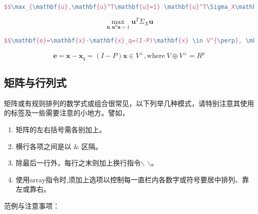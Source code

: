   \begin{lstlisting}[language=TeX,numbers=none,frame=lrtb,label=bast,caption=\song 最佳化问题] 
   $$\max_{\mathbf{u},\mathbf{u}^T\mathbf{u}=1} \mathbf{u}^T\Sigma_X\mathbf{u}$$
  \end{lstlisting} 
  $$\max_{\mathbf{u},\mathbf{u}^T\mathbf{u}=1} \mathbf{u}^T\Sigma_X\mathbf{u}$$
  
  \begin{lstlisting}[language=TeX,numbers=none,frame=lrtb,label=somesymbles,caption=\song 几个符号]
  $$\mathbf{e}=\mathbf{x}-\mathbf{x}_q=(I-P)\mathbf{x} \in V^{\perp}, \mbox{where}\; V\oplus V^{\perp}=R^p $$
  \end{lstlisting} 
  $$\mathbf{e}=\mathbf{x}-\mathbf{x}_q=(I-P)\mathbf{x} \in V^{\perp}, \mbox{where}\; V\oplus V^{\perp}=R^p $$


\subsection{矩阵与行列式}
矩阵或有规则排列的数学式或组合很常见，以下列举几种模式，请特别注意其使用的标签及一些需要注意的小地方。譬如，
\begin{enumerate}%
\item 矩阵的左右括号需各别加上。
\item 横行各项之间是以 $\&$ 区隔。
\item 除最后一行外，每行之末则加上换行指令$\backslash$ $\backslash$。
\item 使用array指令时,须加上选项以控制每一直栏内各数字或符号要居中排列、靠左或靠右。
\end{enumerate}
范例与注意事项：
